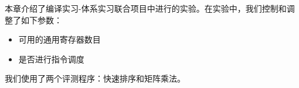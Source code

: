 本章介绍了编译实习-体系实习联合项目中进行的实验。在实验中，我们控制和调整了如下参数：
\begin{itemize}
	\item 可用的通用寄存器数目
	\item 是否进行指令调度
\end{itemize}
我们使用了两个评测程序：快速排序和矩阵乘法。
